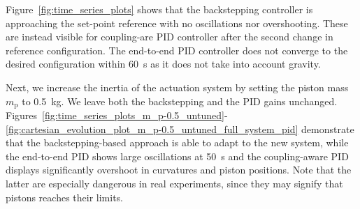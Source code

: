 Figure~\ref{fig:time_series_plots} shows that the backstepping controller is approaching the set-point reference with no oscillations nor overshooting. These are instead visible for coupling-are PID controller after the second change in reference configuration. 
The end-to-end PID controller does not converge to the desired configuration within \SI{60}{s} as it does not take into account gravity.

Next, we increase the inertia of the actuation system by setting the piston mass $m_\mathrm{p}$ to \SI{0.5}{kg}. We leave both the backstepping and the PID gains unchanged. Figures~\ref{fig:time_series_plots_m_p-0.5_untuned}-\ref{fig:cartesian_evolution_plot_m_p-0.5_untuned_full_system_pid} demonstrate that the backstepping-based approach is able to adapt to the new system, while the end-to-end PID shows large oscillations at \SI{50}{s} and the coupling-aware PID displays significantly overshoot in curvatures and piston positions. 
Note that the latter are especially dangerous in real experiments, since they may signify that pistons reaches their limits.

